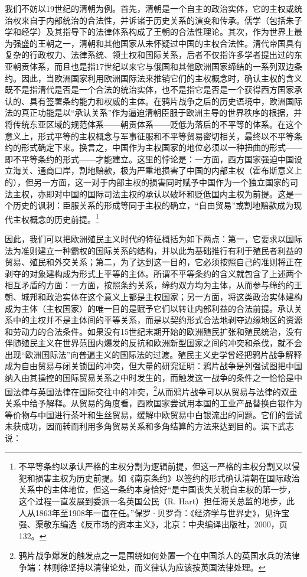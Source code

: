 \documentclass[a4paper, 12pt, openright]{ctexbook}
\begin{document}
我们不妨以19世纪的清朝为例。首先，清朝是一个自主的政治实体，它的主权或统治权来自于内部统治的合法性，并诉诸于历史关系的演变和传承。儒学（包括朱子学和经学）及其指导下的法律体系构成了王朝的合法性理论。其次，作为世界上最为强盛的王朝之一，清朝和其他国家从未怀疑过中国的主权合法性。清代帝国具有复杂的行政权力、法律系统、领土权和国际关系，后者不仅指许多学者提出过的东亚朝贡体系，而且也是指17世纪以来它与俄国和其他欧洲国家缔结的一系列双边条约。因此，当欧洲国家利用欧洲国际法来推销它们的主权概念时，确认主权的含义既不是指清代是否是一个合法的统治实体，也不是指它是否是一个获得西方国家承认的、具有签署条约能力和权威的主体。在鸦片战争之后的历史语境中，欧洲国际法的真正功能是以“承认关系”作为逼迫清朝臣服于欧洲主导的世界秩序的根据，并将传统东亚区域的规范体系——朝贡体系——贬低为落后的不平等的体系。在这个意义上，形式平等的主权概念与军事征服和不平等贸易密切相关，最终以不平等条约的形式确定下来。换言之，中国作为主权国家的地位必须以一种扭曲的形式——即不平等条约的形式——才能建立。这里的悖论是：一方面，西方国家强迫中国设立海关、通商口岸，割地赔款，极为严重地损害了中国的内部主权（霍布斯意义上的），但另一方面，这一对于内部主权的损害同时赋予中国作为一个独立国家的司法主权，亦即对中国的国际司法主权的承认以破坏和贬低国内主权为前提。这是一个历史的讽刺：臣服关系的形成等同于主权的确立，“自由贸易”或割地赔款成为现代主权概念的历史前提。\footnote{不平等条约以承认严格的主权分割为逻辑前提，但这一严格的主权分割又以侵犯和损害主权为历史前提。如《南京条约》以签约的形式确认清朝在国际政治关系中的主体地位，但这一条约本身恰好“是中国丧失关税自主权的第一步，这个过程一直发展到委派一名英国公民（R. Hart）担任海关总监的地步，此人从1863年至1908年一直在任。”保罗·贝罗奇：《经济学与世界史》，见许宝强、渠敬东编选《反市场的资本主义》，北京：中央编译出版社，2000，页132。}

因此，我们可以把欧洲殖民主义时代的特征概括为如下两点：第一，它要求以国际法为准则建立一种霸权的国际关系的结构，并以此为基础推行有利于殖民者利益的贸易、殖民和外交关系；第二，为了达到这一目的，它必须按照自己的准则将正在剥夺的对象建构成为形式上平等的主体。所谓不平等条约的含义就包含了上述两个相互矛盾的方面：一方面，按照条约关系，缔约双方均为主体，从而参与缔约的王朝、城邦和政治实体在这个意义上都是主权国家；另一方面，将这类政治实体建构成为主体（主权国家）的唯一目的是赋予它们以转让内部利益的合法前提。承认关系中的主权并不是主体间的平等关系，而是以契约形式合法地剥夺边缘地区的资源和劳动力的合法条件。如果没有15世纪末期开始的欧洲殖民扩张和殖民统治，没有伴随殖民主义在世界范围内爆发的反抗和欧洲新型国家之间的冲突和杀伐，就不会出现“欧洲国际法”向普遍主义的国际法的过渡。殖民主义史学曾经把鸦片战争解释成为自由贸易与闭关锁国的冲突，但大量的研究证明：鸦片战争是列强试图把中国纳入由其操控的国际贸易关系之中时发生的，而触发这一战争的条件之一恰恰是中国法律与英国法律在国际交往中的冲突，\footnote{鸦片战争爆发的触发点之一是围绕如何处置一个在中国杀人的英国水兵的法律争端：林则徐坚持以清律论处，而义律认为应该按英国法律处理。}从而鸦片战争可以从贸易与法律的双重关系中给予解释。从贸易的角度看，西欧国家尝试用本国的工业产品替换白银作为等价物与中国进行茶叶和生丝贸易，缓解中欧贸易中白银流出的问题。它们的尝试未获成功，因而转而利用多角贸易关系和多角结算的方法来达到目的。滨下武志说：
\end{document}
